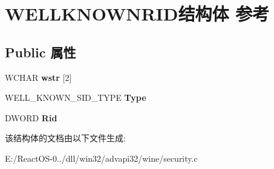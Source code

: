 \hypertarget{struct_w_e_l_l_k_n_o_w_n_r_i_d}{}\section{W\+E\+L\+L\+K\+N\+O\+W\+N\+R\+I\+D结构体 参考}
\label{struct_w_e_l_l_k_n_o_w_n_r_i_d}
\subsection*{Public 属性}
\begin{DoxyCompactItemize}
\item 
\mbox{\label{struct_w_e_l_l_k_n_o_w_n_r_i_d_abc9c662b192920e7c5953f4ec256bf82}} 
W\+C\+H\+AR {\bfseries wstr} \mbox{[}2\mbox{]}
\item 
\mbox{\label{struct_w_e_l_l_k_n_o_w_n_r_i_d_afb6c84ac6eccca44077341573e38ef0b}} 
W\+E\+L\+L\+\_\+\+K\+N\+O\+W\+N\+\_\+\+S\+I\+D\+\_\+\+T\+Y\+PE {\bfseries Type}
\item 
\mbox{\label{struct_w_e_l_l_k_n_o_w_n_r_i_d_a74b2b14d10ff3890c99410adac7f0a6a}} 
D\+W\+O\+RD {\bfseries Rid}
\end{DoxyCompactItemize}


该结构体的文档由以下文件生成\+:\begin{DoxyCompactItemize}
\item 
E\+:/\+React\+O\+S-\/0../dll/win32/advapi32/wine/security.\+c\end{DoxyCompactItemize}
